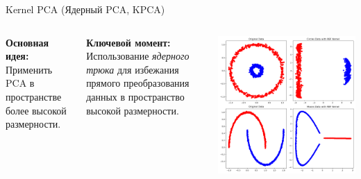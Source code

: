 \begin{frame}[allowframebreaks]{Kernel PCA (Ядерный PCA, KPCA)}
    \begin{columns}
        \textbf{Основная идея:} Применить PCA в пространстве более высокой размерности.

        \textbf{Ключевой момент:} Использование \textit{ядерного трюка} для избежания прямого преобразования данных в пространство высокой размерности.

        \begin{center}
            \includegraphics[width=1\textwidth]{../resources/methods/kpca.png}
        \end{center}
    \end{columns}


\end{frame}
